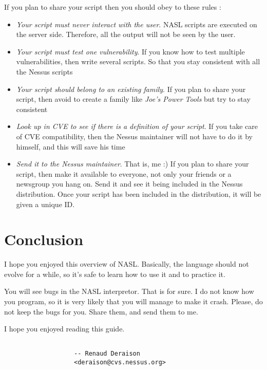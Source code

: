 \documentclass{article}
\begin{document}
If you plan to share your script then you should obey to these rules :
\begin{itemize}
\item \textit{Your script must never interact with the user}. NASL scripts are
executed on the server side. Therefore, all the output will not be seen by
the user. 

\item \textit{Your script must test one vulnerability}. If you know how to test
multiple vulnerabilities, then write several scripts. So that you stay
consistent with all the Nessus scripts

\item \textit{Your script should belong to an existing family}. If you plan
to share your script, then avoid to create a family like \textit{Joe's Power Tools}
but try to stay consistent

\item \textit{Look up in CVE to see if there is a definition of your script}.
If you take care of CVE compatibility, then the Nessus maintainer will not
have to do it by himself, and this will save his time
 
\item \textit{Send it to the Nessus maintainer}. That is, me :) If you plan to share
your script, then make it available to everyone, not only your friends or a newsgroup
you hang on. Send it and see it being included in the Nessus distribution.
Once your script has been included in the distribution, it will be given
a unique ID.
\end{itemize}

\newpage
\section{Conclusion}


I hope you enjoyed this overview of NASL. Basically, the language should not
evolve for a while, so it's safe to learn how to use it and to practice it.

You will see bugs in the NASL interpretor. That is for sure. I do not know how you program, so it is very
likely that you will manage to make it crash. Please, do not keep the bugs for you. Share them, and send them
to me.


I hope you enjoyed reading this guide. 



\begin{verbatim}

				   -- Renaud Deraison
				   <deraison@cvs.nessus.org>
\end{verbatim}
\end{document}
